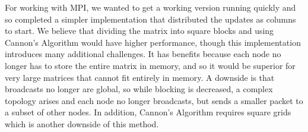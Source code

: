 \documentclass{article}
\begin{document}
For working with MPI, we wanted to get a working version running quickly and so completed a simpler implementation that distributed the updates as columns to start. We believe that dividing the matrix into square blocks and using Cannon's Algorithm would have higher performance, though this implementation introduces many additional challenges. It has benefits because each node no longer has to store the entire matrix in memory, and so it would be superior for very large matrices that cannot fit entirely in memory. A downside is that broadcasts no longer are global, so while blocking is decreased,  a complex topology arises and each node no longer broadcasts, but sends a smaller packet to a subset of other nodes. In addition, Cannon's Algorithm requires square grids which is another downside of this method.
\end{document}
